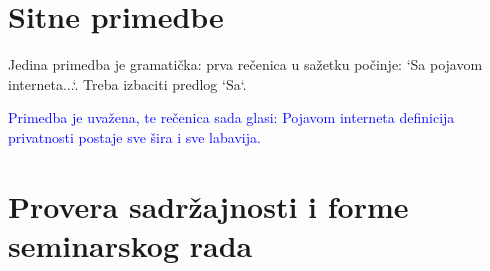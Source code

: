\documentclass[a4paper]{report}
\newcommand{\odgovor}[1]{\textcolor{blue}{#1}}
\begin{document}
\section{Sitne primedbe}
Jedina primedba je gramatička: prva rečenica u sažetku počinje: `Sa pojavom interneta...`. Treba izbaciti predlog `Sa`. 

\odgovor{Primedba je uvažena, te rečenica sada glasi: Pojavom interneta definicija privatnosti postaje sve šira i sve labavija.}

\section{Provera sadržajnosti i forme seminarskog rada}
\end{document}
